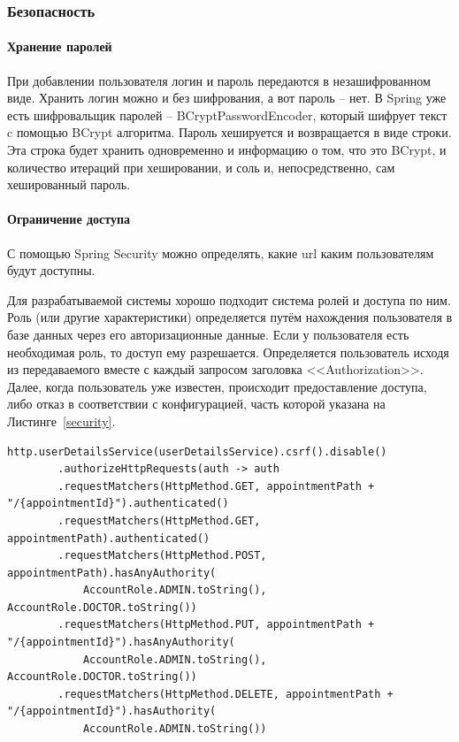 \documentclass[a4paper,article]{article}
\begin{document}
\begin{sloppypar}
    \subsubsection{Безопасность}\label{Реализация. Сервер. Безопасность}

    \paragraph{Хранение паролей}

    При добавлении пользователя логин и пароль передаются в незашифрованном виде. Хранить логин можно и без шифрования, а вот пароль -- нет. В Spring уже есть шифровальщик паролей -- BCryptPasswordEncoder, который шифрует текст c помощью BCrypt алгоритма. Пароль хешируется и возвращается в виде строки. Эта строка будет хранить одновременно и информацию о том, что это BCrypt, и количество итераций при хешировании, и соль и, непосредственно, сам хешированный пароль.

    \paragraph{Ограничение доступа}

    С помощью Spring Security можно определять, какие url каким пользователям будут доступны.

    Для разрабатываемой системы хорошо подходит система ролей и доступа по ним. Роль (или другие характеристики) определяется путём нахождения пользователя в базе данных через его авторизационные данные. Если у пользователя есть необходимая роль, то доступ ему разрешается. Определяется пользователь исходя из передаваемого вместе с каждый запросом заголовка <<Authorization>>. Далее, когда пользователь уже известен, происходит предоставление доступа, либо отказ в соответствии с конфигурацией, часть которой указана на Листинге~\ref{security}.

    \begin{lstlisting}[label=security,caption=Пример кода для разграничения доступа]
    http.userDetailsService(userDetailsService).csrf().disable()
        .authorizeHttpRequests(auth -> auth
        .requestMatchers(HttpMethod.GET, appointmentPath + "/{appointmentId}").authenticated()
        .requestMatchers(HttpMethod.GET, appointmentPath).authenticated()
        .requestMatchers(HttpMethod.POST, appointmentPath).hasAnyAuthority(
            AccountRole.ADMIN.toString(), AccountRole.DOCTOR.toString())
        .requestMatchers(HttpMethod.PUT, appointmentPath + "/{appointmentId}").hasAnyAuthority(
            AccountRole.ADMIN.toString(), AccountRole.DOCTOR.toString())
        .requestMatchers(HttpMethod.DELETE, appointmentPath + "/{appointmentId}").hasAuthority(
            AccountRole.ADMIN.toString())
    \end{lstlisting}


\end{sloppypar}
\end{document}
